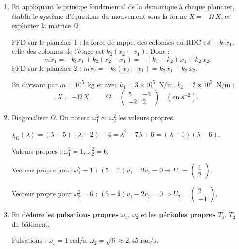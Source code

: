 \begin{enumerate}[itemsep=2em]
\begin{enumerate}[label=\alph*), itemsep=0.6em]
  \item En appliquant le principe fondamental de la dynamique à chaque plancher, établir le système d'équations du mouvement sous la forme $\ddot{X} = -\Omega\, X$, et expliciter la matrice $\Omega$.

\begin{solution}
PFD sur le plancher 1 : la force de rappel des colonnes du RDC est $-k_1 x_1$, celle des colonnes de l'étage est $k_2(x_2 - x_1)$. Donc :
\[
m\ddot{x}_1 = -k_1 x_1 + k_2(x_2 - x_1) = -(k_1+k_2)\,x_1 + k_2\, x_2.
\]
PFD sur le plancher 2 : $m\ddot{x}_2 = -k_2(x_2 - x_1) = k_2\,x_1 - k_2\,x_2$.

En divisant par $m = 10^5$~kg et avec $k_1 = 3\times 10^5$~N/m, $k_2 = 2\times 10^5$~N/m :
\[
  \ddot{X} = -\Omega\, X, \qquad
  \Omega = \begin{pmatrix} 5 & -2 \\ -2 & 2 \end{pmatrix} \quad (\text{en s}^{-2}).
\]
\end{solution}

  \item Diagonaliser $\Omega$. On notera $\omega_1^2$ et $\omega_2^2$ les valeurs propres.

\begin{solution}
$\chi_\Omega(\lambda) = (\lambda - 5)(\lambda - 2) - 4 = \lambda^2 - 7\lambda + 6 = (\lambda - 1)(\lambda - 6)$.

Valeurs propres : $\omega_1^2 = 1$, $\omega_2^2 = 6$.

Vecteur propre pour $\omega_1^2 = 1$ : $(5-1)v_1 - 2v_2 = 0 \Rightarrow U_1 = \begin{pmatrix} 1 \\ 2 \end{pmatrix}$.

Vecteur propre pour $\omega_2^2 = 6$ : $(5-6)v_1 - 2v_2 = 0 \Rightarrow U_2 = \begin{pmatrix} 2 \\ -1 \end{pmatrix}$.
\end{solution}

  \item En déduire les \textbf{pulsations propres} $\omega_1$, $\omega_2$ et les \textbf{périodes propres} $T_1$, $T_2$ du bâtiment.

\begin{solution}
Pulsations : $\omega_1 = 1\;\mathrm{rad/s}$, $\omega_2 = \sqrt{6} \approx 2{,}45\;\mathrm{rad/s}$.


\end{solution}
\end{enumerate}
\end{enumerate}
